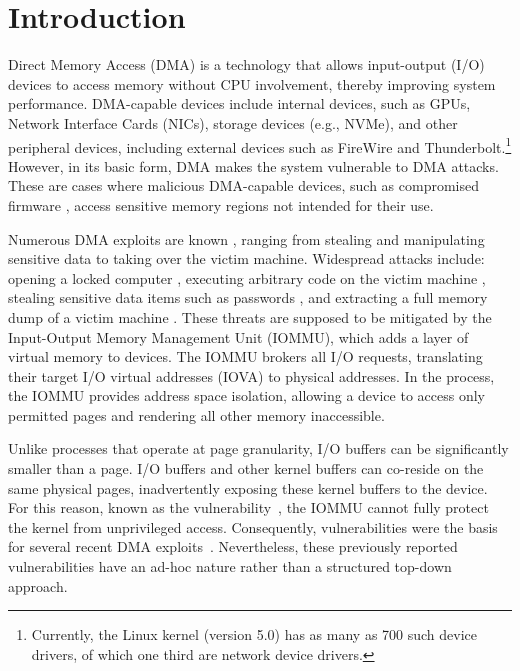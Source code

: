 \section{Introduction}

Direct Memory Access (DMA) is a technology that allows input-output (I/O) devices to access memory without CPU involvement, thereby improving system performance.
DMA-capable devices include internal devices, such as GPUs, Network Interface Cards (NICs), storage devices (e.g., NVMe), and other peripheral devices, including external devices such as FireWire and Thunderbolt.\footnote{Currently, the Linux kernel (version 5.0) has as many as 700 such device drivers, of which one third are network device drivers.} However, in its basic form, DMA makes the system vulnerable to DMA attacks. These are cases where malicious DMA-capable devices, such as  compromised firmware \cite{Gal14,Ben17a}, access sensitive memory regions not intended for their use. 


Numerous DMA exploits are known \cite{Dor04,BDK10,thunder}, ranging from stealing and manipulating sensitive data to taking over the victim machine. Widespread attacks include: opening a locked computer \cite{MM, Fin14}, executing arbitrary code on the victim machine \cite{Fri16, Woj08, AD10,thunder}, stealing sensitive data items such as passwords \cite{SB12, LKV13, Cim16, BR12}, and extracting a full memory dump of a victim machine \cite{MM, Vol, Fin14, GA10}. These threats are supposed to be mitigated by the Input-Output Memory Management Unit (IOMMU), which adds a layer of virtual memory to devices. The IOMMU brokers all I/O requests, translating their target I/O virtual addresses (IOVA) to physical addresses. In the process, the IOMMU provides address space isolation, allowing a device to access only permitted pages and rendering all other memory inaccessible.

Unlike processes that operate at page granularity, I/O buffers can be significantly smaller than a page. I/O buffers and other kernel buffers can co-reside on the same physical pages, inadvertently exposing these kernel buffers to the device. For this reason, known as the \subpage{} vulnerability~\cite{MMT16,thunder}, the IOMMU cannot fully protect the kernel from unprivileged access. Consequently, \subpage{} vulnerabilities were the basis for several recent DMA exploits~\cite{kupfer2018iommu,thunder,Ben17a,Ben17b}.
Nevertheless, these previously reported vulnerabilities have an ad-hoc nature rather than a structured top-down approach. 

